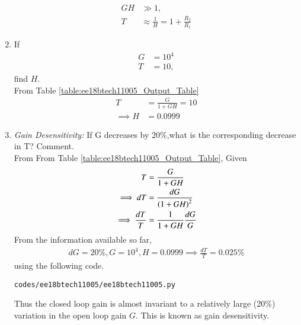 \begin{enumerate}[label=\thesection.\arabic*.,ref=\thesection.\theenumi]
\begin{align}
 GH &\gg 1,
 \\
T &\approx \frac{1}{H}  = 1 + \frac{R_2}{R_1} 
\end{align}
\item If 
\begin{align} 
G & = 10^4
\\
T &= 10,
\end{align}
find $H$.
\\
\solution From Table \ref{table:ee18btech11005_Output_Table}
\begin{align}
    T &=  \frac{G}{1+GH} = 10
\\
\implies  H &= 0.0999
\end{align}
\item {\em Gain Desensitivity:} If G decreases by 20\%,what is the corresponding decrease in T?  Comment.
\\
\solution From From Table \ref{table:ee18btech11005_Output_Table},
Given
\begin{align}
T &= \frac{G}{1+GH}
\\
\implies dT &= \frac{dG}{\left(1+GH\right)^2}
\\
\implies \frac{dT}{T} &= \frac{1}{1+GH}\frac{dG}{G}
\end{align}
From the information available so far, 
\begin{align}
dG = 20\%, G = 10^4, H = 0.0999
\implies \frac{dT}{T} = 0.025\%
\end{align}
%
using the following code.
\begin{lstlisting}
codes/ee18btech11005/ee18btech11005.py
\end{lstlisting}
%
Thus the closed loop gain is almost invariant to a relatively large (20\%) variation in the open loop gain $G$.  This is known as gain desensitivity.
\end{enumerate}
